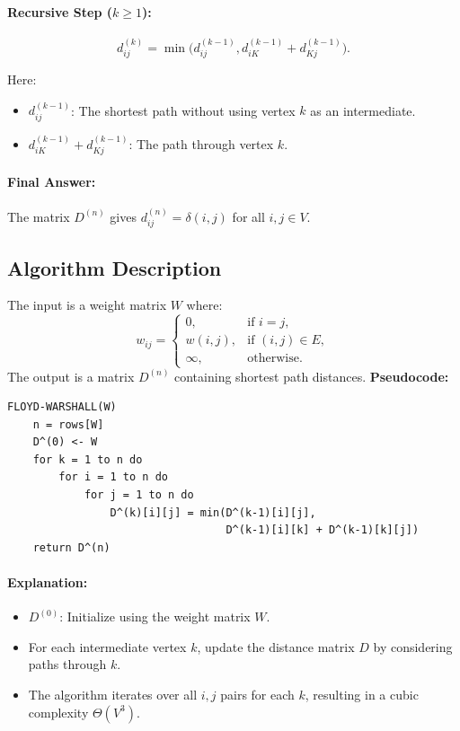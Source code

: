\paragraph{Recursive Step (\( k \geq 1 \)):}
\[
d^{(k)}_{ij} = 
\min\big(d^{(k-1)}_{ij}, d^{(k-1)}_{iK} + d^{(k-1)}_{Kj}\big).
\]

Here:
\begin{itemize}
    \item \( d^{(k-1)}_{ij} \): The shortest path without using vertex \( k \) as an intermediate.
    \item \( d^{(k-1)}_{iK} + d^{(k-1)}_{Kj} \): The path through vertex \( k \).
\end{itemize}

\paragraph{Final Answer:}  
The matrix \( D^{(n)} \) gives \( d^{(n)}_{ij} = \delta(i, j) \) for all \( i, j \in V \).

\subsection{Algorithm Description}
The input is a weight matrix \( W \) where:
\[
w_{ij} = 
\begin{cases} 
0, & \text{if } i = j, \\
w(i, j), & \text{if } (i, j) \in E, \\
\infty, & \text{otherwise.}
\end{cases}
\]
The output is a matrix \( D^{(n)} \) containing shortest path distances. \newline
\textbf{Pseudocode:}
\begin{verbatim}
FLOYD-WARSHALL(W)
    n = rows[W]
    D^(0) <- W
    for k = 1 to n do
        for i = 1 to n do
            for j = 1 to n do
                D^(k)[i][j] = min(D^(k-1)[i][j], 
                                  D^(k-1)[i][k] + D^(k-1)[k][j])
    return D^(n)
\end{verbatim}

\paragraph{Explanation:}
\begin{itemize}
    \item \( D^{(0)} \): Initialize using the weight matrix \( W \).
    \item For each intermediate vertex \( k \), update the distance matrix \( D \) by considering paths through \( k \).
    \item The algorithm iterates over all \( i, j \) pairs for each \( k \), resulting in a cubic complexity \( \Theta(V^3) \).
\end{itemize}


